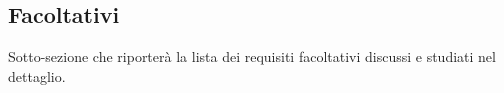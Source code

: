 \subsection{Facoltativi}

Sotto-sezione che riporterà la lista dei requisiti facoltativi discussi e studiati nel dettaglio.
